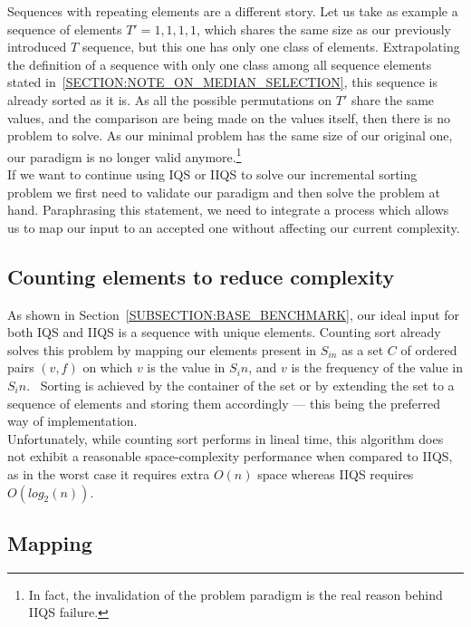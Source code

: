 Sequences with repeating elements are a different story. Let us take as example a sequence of elements $T'={1,1,1,1}$, which shares the same size as our previously introduced $T$ sequence, but this one has only one class of elements. Extrapolating the definition of a sequence with only one class among all sequence elements stated in~\ref{SECTION:NOTE_ON_MEDIAN_SELECTION}, this sequence is already sorted as it is. As all the possible permutations on $T'$ share the same values, and the comparison are being made on the values itself, then there is no problem to solve. As our minimal problem has the same size of our original one, our paradigm is no longer valid anymore.\footnote{In fact, the invalidation of the problem paradigm is the real reason behind IIQS failure.}\\

If we want to continue using IQS or IIQS to solve our incremental sorting problem we first need to validate our paradigm and then solve the problem at hand. Paraphrasing this statement, we need to integrate a process which allows us to map our input to an accepted one without affecting our current complexity.\\

\subsection{Counting elements to reduce complexity}

As shown in Section~\ref{SUBSECTION:BASE_BENCHMARK}, our ideal input for both IQS and IIQS is a sequence with unique elements. Counting sort already solves this problem by mapping our elements present in $S_{in}$ as a set $C$ of ordered pairs $(v,f)$ on which $v$ is the value in $S_in$, and $v$ is the frequency of the value in $S_in$.~\cite{10.5555/280635} Sorting is achieved by the container of the set or by extending the set to a sequence of elements and storing them accordingly --- this being the preferred way of implementation. \\

Unfortunately, while counting sort performs in lineal time, this algorithm does not exhibit a reasonable space-complexity performance when compared to IIQS, as in the worst case it requires extra $O(n)$ space whereas IIQS requires $O(log_2(n))$.\\

\subsection{Mapping}
\label{SECTION:MAPPING}

